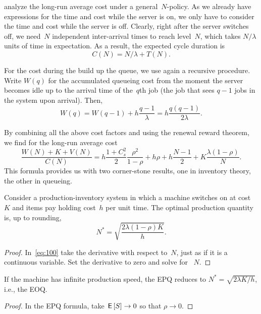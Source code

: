 \documentclass[stochastic-or.tex]{subfiles}
\begin{document}
 analyze the long-run average cost under a general~$N$-policy.
As we already have expressions for the time and cost while the server is on, we only have to consider the time and cost while the server is off.
Clearly, right after the server switches off, we need~$N$ independent inter-arrival times to reach level~$N$, which takes $N/\lambda$ units of time in expectation.
As a result, the expected cycle duration is
\begin{equation*}
C(N) = N/\lambda + T(N).
\end{equation*}


For the cost during the build up the queue, we use again a recursive procedure.
Write $W(q)$ for the accumulated queueing cost
from the moment the server becomes idle up to the arrival time of the~$q$th job (the job that sees $q-1$ jobs in the system upon arrival).
Then,
\begin{equation*}
  W(q) = W(q-1) +  h\frac{q-1}{\lambda}= h \frac{q(q-1)}{2\lambda}.
\end{equation*}

By combining all the above cost factors and using the renewal reward theorem, we find for the long-run average cost
\begin{equation}  \label{eq:100}
    \frac{W(N) + K + V(N)}{C(N)}
    = h \frac{1+ C_s^2}2 \frac{\rho^2}{1-\rho} + h \rho + h \frac{N-1}2 + K \frac{\lambda(1-\rho)}N.
\end{equation}
This formula provides us with two corner-stone results, one in inventory theory, the other in queueing.

\begin{theorem}
Consider a production-inventory system in which a machine switches on at cost~$K$ and items pay holding cost~$h$ per unit time.
The optimal production quantity is,  up to rounding,
\begin{equation*}
  N^* = \sqrt{\frac{2\lambda(1-\rho)K}{h}}.
\end{equation*}
\end{theorem}
\begin{proof}
In~\cref{eq:100} take the derivative with respect to~$N$, just as if it is a continuous variable.
Set the derivative to zero and solve for ~$N$.
\end{proof}

\begin{corollary}
If the machine has infinite production speed, the EPQ reduces to $N^{*} = \sqrt{2\lambda K/h}$, i.e., the EOQ.
\end{corollary}
\begin{proof}
In the EPQ formula,  take $\,\mathsf{E}\left[S\right] \to 0$ so that $\rho \to 0$.
\end{proof}
\end{document}
